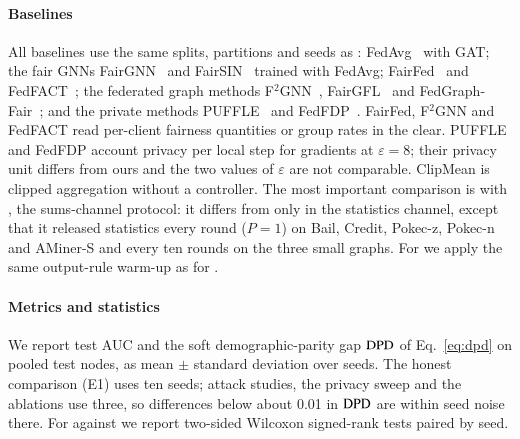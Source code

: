 \paragraph{Baselines}
All baselines use the same splits, partitions and seeds as \rt{}: FedAvg~\citep{mcmahan2017communication} with GAT; the fair GNNs FairGNN~\citep{dai2021say} and FairSIN~\citep{yang2024fairsin} trained with FedAvg; FairFed~\citep{ezzeldin2023fairfed} and FedFACT~\citep{fedfact2025}; the federated graph methods F$^2$GNN~\citep{f2gnn2023}, FairGFL~\citep{fairgfl2026} and FedGraph-Fair~\citep{fedgraphfair2026}; and the private methods PUFFLE~\citep{corbucci2024puffle} and FedFDP~\citep{ling2024feddp}. FairFed, F$^2$GNN and FedFACT read per-client fairness quantities or group rates in the clear. PUFFLE and FedFDP account privacy per local step for gradients at $\varepsilon=8$; their privacy unit differs from ours and the two values of $\varepsilon$ are not comparable. ClipMean is clipped aggregation without a controller. The most important comparison is with \clamp{}, the sums-channel protocol: it differs from \rt{} only in the statistics channel, except that it released statistics every round ($P=1$) on Bail, Credit, Pokec-z, Pokec-n and AMiner-S and every ten rounds on the three small graphs. For \clamp{} we apply the same output-rule warm-up as for \rt{}.

\paragraph{Metrics and statistics}
We report test AUC and the soft demographic-parity gap $\mathrm{DPD}$ of Eq.~\eqref{eq:dpd} on pooled test nodes, as mean $\pm$ standard deviation over seeds. The honest comparison (E1) uses ten seeds; attack studies, the privacy sweep and the ablations use three, so differences below about 0.01 in $\mathrm{DPD}$ are within seed noise there. For \rt{} against \clamp{} we report two-sided Wilcoxon signed-rank tests paired by seed.

